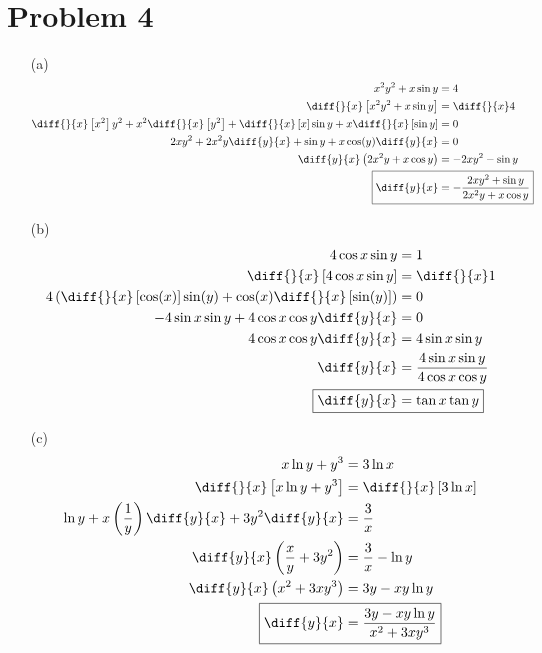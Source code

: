\documentclass{article}
\begin{document}
\section*{Problem 4}
\begin{itemize}
\item[(a)]
	\begin{align*}
		x^2y^2+x\sin y&=4 \\
		\diff{}{x}\left[x^2y^2+x\sin y\right]&=\diff{}{x}4 \\
		\diff{}{x}\left[x^2\right]y^2+x^2\diff{}{x}\left[y^2\right]+\diff{}{x}\left[x\right]\sin y+x\diff{}{x}\left[\sin y\right]&=0 \\
		2xy^2+2x^2y\diff{y}{x}+\sin y+x\cos(y)\diff{y}{x}&=0 \\
		\diff{y}{x}\left(2x^2y+x\cos y\right)&=-2xy^2-\sin y \\
		\Aboxed{\diff{y}{x}&=-\frac{2xy^2+\sin y}{2x^2y+x\cos y}}
	\end{align*}

\item[(b)]
	\begin{align*}
		4\cos x\sin y&=1 \\
		\diff{}{x}\left[4\cos x\sin y\right]&=\diff{}{x}1 \\
		4\left(\diff{}{x}\left[\cos(x)\right]\sin(y)+\cos(x)\diff{}{x}\left[\sin(y)\right]\right)&=0 \\
		-4\sin x\sin y+4\cos x\cos y\diff{y}{x}&=0 \\
		4\cos x\cos y\diff{y}{x}&=4\sin x\sin y \\
		\diff{y}{x}&=\frac{4\sin x\sin y}{4\cos x\cos y} \\
		\Aboxed{\diff{y}{x}&=\tan x\tan y}
	\end{align*}

\item[(c)]
	\begin{align*}
		x\ln y+y^3&=3\ln x \\
		\diff{}{x}\left[x\ln y+y^3\right]&=\diff{}{x}\left[3\ln x\right] \\
		\ln y+x\left(\frac{1}{y}\right)\diff{y}{x}+3y^2\diff{y}{x}&=\frac{3}{x} \\
		\diff{y}{x}\left(\frac{x}{y}+3y^2\right)&=\frac{3}{x}-\ln y \\
		\diff{y}{x}\left(x^2+3xy^3\right)&=3y-xy\ln y \\
		\Aboxed{\diff{y}{x}&=\frac{3y-xy\ln y}{x^2+3xy^3}}
	\end{align*}


\end{itemize}
\end{document}
